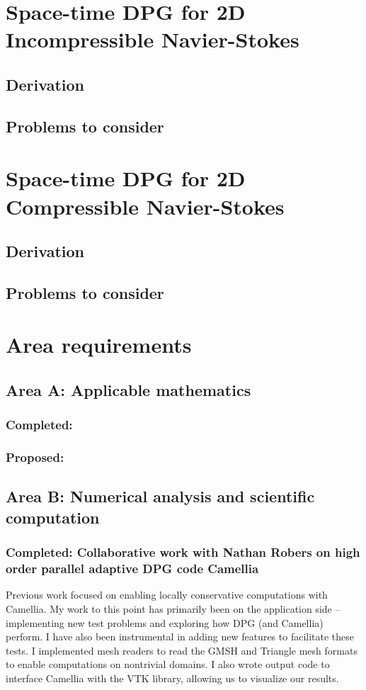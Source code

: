\documentclass[12pt]{report}
\begin{document}
\section{Space-time DPG for 2D Incompressible Navier-Stokes}

\subsection{Derivation}

\subsection{Problems to consider}


\section{Space-time DPG for 2D Compressible Navier-Stokes}

\subsection{Derivation}

\subsection{Problems to consider}


\section{Area requirements}

\subsection{Area A: Applicable mathematics}
\subsubsection*{Completed:}
\subsubsection*{Proposed:}

\subsection{Area B: Numerical analysis and scientific computation}
\subsubsection*{Completed: Collaborative work with Nathan Robers on high order parallel adaptive DPG code Camellia}
Previous work focused on enabling locally conservative computations with Camellia. My work to this point has primarily been on the application side -- implementing new test problems and exploring how DPG (and Camellia) perform. I have also been instrumental in adding new features to facilitate these tests. I implemented mesh readers to read the GMSH and Triangle mesh formats to enable computations on nontrivial domains. I also wrote output code to interface Camellia with the VTK library, allowing us to visualize our results.
\end{document}
